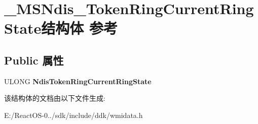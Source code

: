 \hypertarget{struct___m_s_ndis___token_ring_current_ring_state}{}\section{\+\_\+\+M\+S\+Ndis\+\_\+\+Token\+Ring\+Current\+Ring\+State结构体 参考}
\label{struct___m_s_ndis___token_ring_current_ring_state}
\subsection*{Public 属性}
\begin{DoxyCompactItemize}
\item 
\mbox{\label{struct___m_s_ndis___token_ring_current_ring_state_adbc505331c7deb3ecae7bd9a55ed3626}} 
U\+L\+O\+NG {\bfseries Ndis\+Token\+Ring\+Current\+Ring\+State}
\end{DoxyCompactItemize}


该结构体的文档由以下文件生成\+:\begin{DoxyCompactItemize}
\item 
E\+:/\+React\+O\+S-\/0../sdk/include/ddk/wmidata.\+h\end{DoxyCompactItemize}
